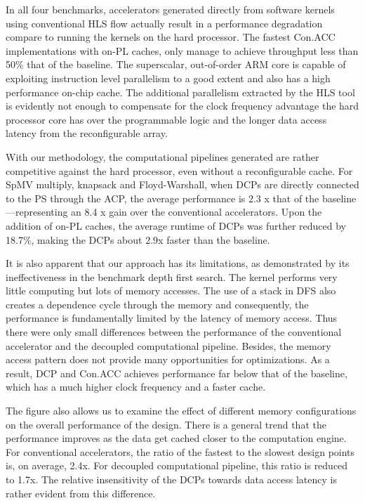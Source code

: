 In all four benchmarks, accelerators generated directly from software kernels using conventional HLS flow
actually result in a performance degradation compare to running the kernels on the hard processor. The fastest Con.ACC implementations with
on-PL caches, only manage to achieve throughput less than 50\% that of the baseline. 
The superscalar, 
out-of-order ARM core is capable of exploiting instruction level parallelism to a good extent 
and also has a high performance on-chip cache.
The additional parallelism extracted by the HLS tool is evidently not enough
to compensate for the clock frequency advantage the hard processor core has over the programmable logic and the longer data access
latency from the reconfigurable array. 

With our methodology, the computational pipelines generated 
are rather competitive against the hard processor, even
without a reconfigurable cache. For SpMV multiply, knapsack and Floyd-Warshall, when DCPs are directly connected to the PS through the ACP, 
the average performance is 2.3 x that of the baseline---representing
an 8.4 x gain over the conventional accelerators.
Upon the addition of on-PL caches,  
the average runtime of DCPs was further reduced by 18.7\%, making the DCPs about 2.9x faster than the baseline.

It is also apparent that our approach has its limitations, as demonstrated by its ineffectiveness in the benchmark depth first search.
The kernel performs very little computing but lots of memory accesses.
The use of a stack in DFS also creates a dependence cycle through the memory
and consequently, the performance is fundamentally limited by the latency of memory access.
Thus there were only small differences between the performance of the conventional accelerator and the decoupled computational pipeline. Besides, the memory access pattern
does not provide many opportunities for optimizations. As a result, DCP and Con.ACC achieves performance far below that of the baseline, 
which has a much higher clock frequency and a faster cache.     


The figure also allows us to examine the effect of different memory configurations on the overall performance of the design. There is a general trend that the performance improves as the 
data get cached closer to the computation engine. For conventional accelerators, the ratio of the fastest to the slowest design points is, on average, 2.4x. For decoupled computational pipeline,
this ratio is reduced to 1.7x. The relative insensitivity of the DCPs towards data access latency
is rather evident from this difference.

